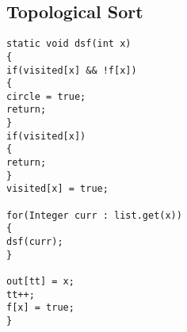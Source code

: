 \subsection{Topological Sort}
\begin{lstlisting}
static void dsf(int x)
{
if(visited[x] && !f[x])
{
circle = true;
return;
}
if(visited[x])
{
return;
}
visited[x] = true;

for(Integer curr : list.get(x))
{
dsf(curr);
}

out[tt] = x;
tt++;
f[x] = true;
}
\end{lstlisting}